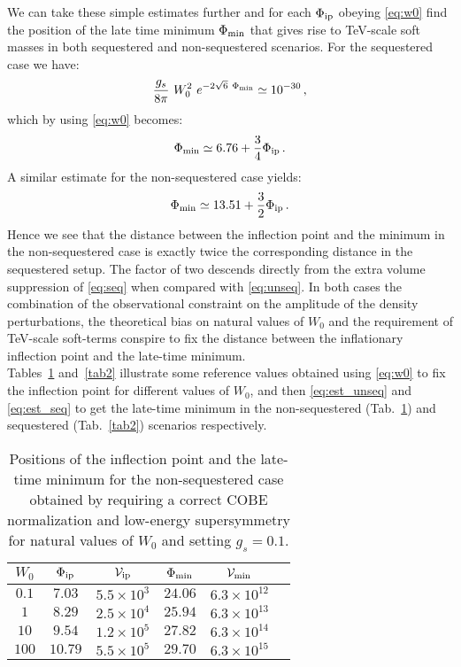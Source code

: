 \documentclass[12pt,a4paper]{book}
\newcommand\vo{{\mathcal{V}}}
\begin{document}
We can take these simple estimates further and for each $\Phi_{\rm ip}$ obeying \eqref{eq:w0} find the position of the late time minimum $\Phi_{\rm min}$ that gives rise to TeV-scale soft masses in both sequestered and non-sequestered scenarios. For the sequestered case we have:
\begin{align}
\frac{g_s}{8 \pi}\ W_0^2 \ e^{-2 \sqrt{6}\ \Phi_{\rm min}}\simeq 10^{-30}\,,
\end{align}
which by using \eqref{eq:w0} becomes:
\begin{align}
\Phi_{\rm min}\simeq 6.76 +\frac{3}{4}\Phi_{\rm ip}\,.
\label{eq:est_seq}
\end{align}
A similar estimate for the non-sequestered case yields:
\begin{align}
\Phi_{\rm min}\simeq 13.51 +\frac{3}{2}\Phi_{\rm ip}\,.
\label{eq:est_unseq}
\end{align}
Hence we see that the distance between the inflection point and the minimum in the non-sequestered case is exactly twice the corresponding distance in the sequestered setup. The factor of two descends directly from the extra volume suppression of \eqref{eq:seq} when compared with \eqref{eq:unseq}. In both cases the combination of the observational constraint on the amplitude of the density perturbations, the theoretical bias on natural values of $W_0$ and the requirement of TeV-scale soft-terms conspire to fix the distance between the inflationary inflection point and the late-time minimum.\\

Tables~\ref{tab1} and~\ref{tab2} illustrate some reference values obtained using \eqref{eq:w0} to fix the inflection point for different values of $W_0$, and then \eqref{eq:est_unseq} and \eqref{eq:est_seq} to get the late-time minimum in the non-sequestered (Tab.~\ref{tab1}) and sequestered (Tab.~\ref{tab2}) scenarios respectively.

\begin{table}[ht!]
\begin{center}
\begin{tabular}{cccccc}
\hline
$W_0$ & $\Phi_{\rm ip}$ & $\vo_{\rm ip}$ & $\Phi_{\rm min}$ & $\vo_{\rm min}$  \\
\hline
$0.1$ & $7.03$ & $5.5 \times 10^3$ & $24.06$  & $6.3 \times 10^{12}$ \\
\hline
$1$ & $8.29$ & $2.5 \times 10^4$ & $25.94$ & $6.3 \times 10^{13}$ \\
\hline
$10$ & $9.54$ & $1.2 \times 10^5$ & $27.82$ & $6.3 \times 10^{14}$ \\
\hline
$100$ & $10.79$ & $5.5 \times 10^5$ & $29.70$ & $6.3 \times 10^{15}$ \\
\hline
\end{tabular}
\end{center}
\caption{Positions of the inflection point and the late-time minimum for the non-sequestered case obtained by requiring a correct COBE normalization and low-energy supersymmetry for natural values of $W_0$ and setting $g_s=0.1$.}
\label{tab1}
\end{table}
\end{document}

